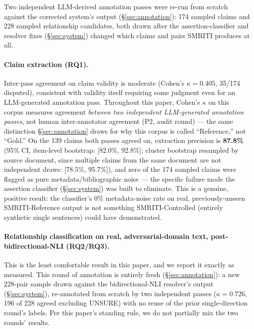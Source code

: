 Two independent LLM-derived annotation passes were re-run from scratch
against the corrected system's output (\S\ref{sec:annotation}): 174
sampled claims and 228 sampled relationship candidates, both drawn after
the assertion-classifier and resolver fixes (\S\ref{sec:system}) changed
which claims and pairs SMRITI produces at all.

\paragraph{Claim extraction (RQ1).} Inter-pass agreement on claim validity
is moderate (Cohen's $\kappa = 0.405$, 35/174 disputed), consistent with
validity itself requiring some judgment even for an LLM-generated
annotation pass. Throughout this paper, Cohen's $\kappa$ on this corpus
measures agreement \emph{between two independent LLM-generated
annotation passes}, not human inter-annotator agreement (P2, audit
round) --- the same distinction \S\ref{sec:annotation} draws for why
this corpus is called ``Reference,'' not ``Gold.'' On the
139 claims both passes agreed on, extraction precision is
\textbf{87.8\%} (95\% CI, item-level bootstrap: [82.0\%, 92.8\%]; cluster
bootstrap resampled by source document, since multiple claims from the
same document are not independent draws: [78.5\%, 95.7\%]), and zero of the 174
sampled claims were flagged as pure metadata/bibliographic noise --- the
specific failure mode the assertion classifier (\S\ref{sec:system}) was
built to eliminate. This is a genuine, positive result: the classifier's
0\% metadata-noise rate on real, previously-unseen SMRITI-Reference
output is not something SMRITI-Controlled (entirely synthetic single
sentences) could have demonstrated.

\paragraph{Relationship classification on real, adversarial-domain text,
post-bidirectional-NLI (RQ2/RQ3).} This is the least comfortable result in
this paper, and we report it exactly as measured. This round of
annotation is entirely fresh (\S\ref{sec:annotation}): a new 228-pair
sample drawn against the bidirectional-NLI resolver's output
(\S\ref{sec:system}), re-annotated from scratch by two independent
passes ($\kappa = 0.726$, 196 of 228 agreed excluding UNSURE) with no
reuse of the prior single-direction round's labels. Per this paper's
standing rule, we do not partially mix the two rounds' results.

